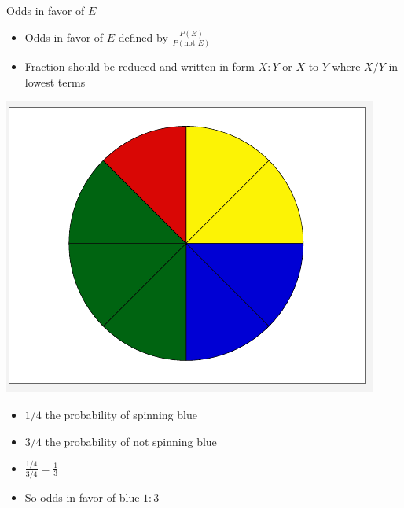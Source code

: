 \documentclass[handout]{beamer}
\theoremstyle{definition}
\begin{document}
\begin{frame}{Odds in favor of $E$}
\begin{definition}
\begin{itemize}
\item \alert{Odds in favor of $E$} defined by
$\frac{P\left(E\right)}{P\left(\text{not $E$}\right)}$
\item Fraction should be reduced and written
in form \alert{$X:Y$} or \alert{$X$-to-$Y$}
where $X/Y$ in lowest terms
\end{itemize}
\end{definition}
\begin{example}
\begin{multicols}{2}
\includegraphics[scale=.30]{Spinner}
\begin{itemize}
\item $1/4$ the probability of spinning blue
\item $3/4$ the probability of \alert{not} spinning blue
\item $\frac{1/4}{3/4}=\frac{1}{3}$
\item So odds in favor of blue $1:3$
\end{itemize}
\end{multicols}
\end{example}
\end{frame}
\end{document}
